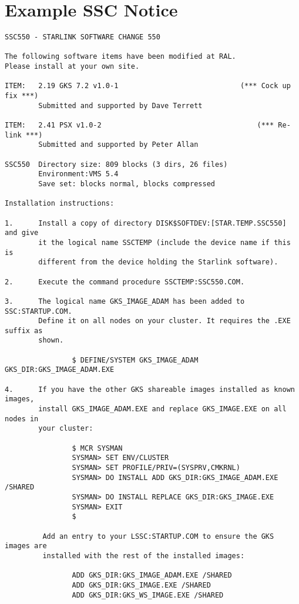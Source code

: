 \section {Example SSC Notice}
\label{se:ex.note}
\begin{verbatim}
SSC550 - STARLINK SOFTWARE CHANGE 550

The following software items have been modified at RAL.
Please install at your own site.

ITEM:   2.19 GKS 7.2 v1.0-1                             (*** Cock up fix ***)
        Submitted and supported by Dave Terrett

ITEM:   2.41 PSX v1.0-2                                     (*** Re-link ***)
        Submitted and supported by Peter Allan

SSC550  Directory size: 809 blocks (3 dirs, 26 files)
        Environment:VMS 5.4
        Save set: blocks normal, blocks compressed

Installation instructions:

1.      Install a copy of directory DISK$SOFTDEV:[STAR.TEMP.SSC550] and give
        it the logical name SSCTEMP (include the device name if this is
        different from the device holding the Starlink software).

2.      Execute the command procedure SSCTEMP:SSC550.COM.

3.      The logical name GKS_IMAGE_ADAM has been added to SSC:STARTUP.COM.
        Define it on all nodes on your cluster. It requires the .EXE suffix as
        shown.

                $ DEFINE/SYSTEM GKS_IMAGE_ADAM GKS_DIR:GKS_IMAGE_ADAM.EXE

4.      If you have the other GKS shareable images installed as known images,
        install GKS_IMAGE_ADAM.EXE and replace GKS_IMAGE.EXE on all nodes in
        your cluster:

                $ MCR SYSMAN
                SYSMAN> SET ENV/CLUSTER
                SYSMAN> SET PROFILE/PRIV=(SYSPRV,CMKRNL)
                SYSMAN> DO INSTALL ADD GKS_DIR:GKS_IMAGE_ADAM.EXE /SHARED
                SYSMAN> DO INSTALL REPLACE GKS_DIR:GKS_IMAGE.EXE
                SYSMAN> EXIT
                $

         Add an entry to your LSSC:STARTUP.COM to ensure the GKS images are
         installed with the rest of the installed images:

                ADD GKS_DIR:GKS_IMAGE_ADAM.EXE /SHARED
                ADD GKS_DIR:GKS_IMAGE.EXE /SHARED
                ADD GKS_DIR:GKS_WS_IMAGE.EXE /SHARED


\end{verbatim}
